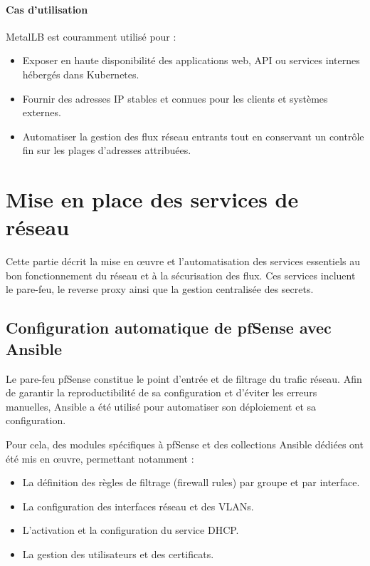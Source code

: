 \paragraph{Cas d’utilisation}

MetalLB est couramment utilisé pour :
\begin{itemize}
	\item Exposer en haute disponibilité des applications web, API ou services internes hébergés dans Kubernetes.
	\item Fournir des adresses IP stables et connues pour les clients et systèmes externes.
	\item Automatiser la gestion des flux réseau entrants tout en conservant un contrôle fin sur les plages d’adresses attribuées.
\end{itemize}

\section{Mise en place des services de réseau}

Cette partie décrit la mise en œuvre et l’automatisation des services essentiels au bon fonctionnement du réseau et à la sécurisation des flux. Ces services incluent le pare-feu, le reverse proxy ainsi que la gestion centralisée des secrets.

\subsection{Configuration automatique de pfSense avec Ansible}

Le pare-feu pfSense constitue le point d’entrée et de filtrage du trafic réseau. Afin de garantir la reproductibilité de sa configuration et d’éviter les erreurs manuelles, Ansible a été utilisé pour automatiser son déploiement et sa configuration.

Pour cela, des modules spécifiques à pfSense et des collections Ansible dédiées ont été mis en œuvre, permettant notamment :
\begin{itemize}
	\item La définition des règles de filtrage (firewall rules) par groupe et par interface.
	\item La configuration des interfaces réseau et des VLANs.
	\item L’activation et la configuration du service DHCP.
	\item La gestion des utilisateurs et des certificats.
\end{itemize}

